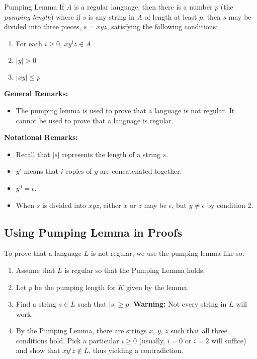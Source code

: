 \documentclass[letterpaper]{article}
\begin{document}
\begin{theorem}{Pumping Lemma}{}
    If $A$ is a regular language, then there is a number $p$ (the \emph{pumping length}) where if $s$ is any string in $A$ of length at least $p$, then $s$ may be divided into three pieces, $s = xyz$, satisfying the following conditions: 
    \begin{enumerate}
        \item For each $i \geq 0$, $xy^i z \in A$
        \item $|y| > 0$
        \item $|xy| \leq p$
    \end{enumerate}
\end{theorem}
\textbf{General Remarks:}
\begin{itemize}
    \item The pumping lemma is used to prove that a language is not regular. It cannot be used to prove that a language is regular. 
\end{itemize}
\textbf{Notational Remarks:}
\begin{itemize}
    \item Recall that $|s|$ represents the length of a string $s$.
    \item $y^i$ means that $i$ copies of $y$ are concatenated together. 
    \item $y^0 = \epsilon$.
    \item When $s$ is divided into $xyz$, either $x$ or $z$ may be $\epsilon$, but $y \neq \epsilon$ by condition 2. 
\end{itemize}

\subsection{Using Pumping Lemma in Proofs}
To prove that a language $L$ is not regular, we use the pumping lemma like so: 
\begin{enumerate}
    \item Assume that $L$ is regular so that the Pumping Lemma holds.
    \item Let $p$ be the pumping length for $K$ given by the lemma.
    \item Find a string $s \in L$ such that $|s| \geq p$. \textbf{Warning:} Not every string in $L$ will work. 
    \item By the Pumping Lemma, there are strings $x$, $y$, $z$ such that all three conditions hold. Pick a particular $i \geq 0$ (usually, $i = 0$ or $i = 2$ will suffice) and show that $xy^i z \notin L$, thus yielding a contradiction. 
\end{enumerate}
\end{document}
